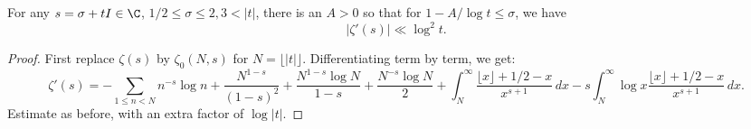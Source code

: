 \begin{lemma}[ZetaDerivUpperBnd]
\label{ZetaDerivUpperBnd}
\leanok
For any $s = \sigma + tI \in \C$, $1/2 \le \sigma\le 2, 3 < |t|$,
  there is an $A>0$ so that for $1-A/\log t \le \sigma$, we have
  $$
  |\zeta'(s)| \ll \log^2 t.
  $$
\end{lemma}
\begin{proof}
\leanok
First replace $\zeta(s)$ by $\zeta_0(N,s)$ for $N = \lfloor |t| \rfloor$.
  Differentiating term by term, we get:
  $$
  \zeta'(s) = -\sum_{1\le n < N} n^{-s} \log n
  + \frac{N^{1 - s}}{(1 - s)^2} + \frac{N^{1 - s} \log N} {1 - s}
  + \frac{N^{-s}\log N}{2} +
  \int_N^\infty \frac{\lfloor x\rfloor + 1/2 - x}{x^{s+1}} \, dx
  -s \int_N^\infty \log x \frac{\lfloor x\rfloor + 1/2 - x}{x^{s+1}} \, dx
  .
  $$
  Estimate as before, with an extra factor of $\log |t|$.
\end{proof}
